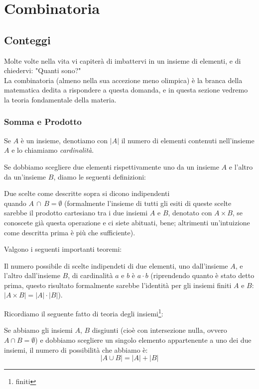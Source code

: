 \documentclass[11pt]{scrartcl}
\begin{document}
	\section{Combinatoria}
	
	\subsection{Conteggi}
	Molte volte nella vita vi capiterà di imbattervi in un insieme di elementi, e di chiedervi: "Quanti sono?"
	\\
	La combinatoria (almeno nella sua accezione meno olimpica) è la branca della matematica dedita a rispondere a questa domanda, e in questa sezione vedremo la teoria fondamentale della materia.
	
	\subsubsection{Somma e Prodotto}
	\begin{definition}
		Se $A$ è un insieme, denotiamo con $|A|$ il numero di elementi contenuti nell'insieme $A$ e lo chiamiamo \textit{cardinalità}.
	\end{definition}
	Se dobbiamo scegliere due elementi rispettivamente uno da un insieme $A$ e l'altro da un'insieme $B$, diamo le seguenti definizioni:
	\begin{definition}
		Due scelte come descritte sopra si dicono indipendenti \\ quando $A \, \cap \, B = \emptyset$ (formalmente l'insieme di tutti gli esiti di queste scelte sarebbe il prodotto cartesiano tra i due insiemi $A$ e $B$, denotato con $A \times B$, se conoscete già questa operazione e ci siete abituati, bene; altrimenti un'intuizione come descritta prima è più che sufficiente).
	\end{definition}
	Valgono i seguenti importanti teoremi:
	\begin{theorem}
		\label{C:prod}
		Il numero possibile di scelte indipendeti di due elementi, uno dall'insieme $A$, e l'altro dall'insieme $B$, di cardinalità $a$ e $b$ è $a \cdot b$ (riprendendo quanto è stato detto prima, questo risultato formalmente sarebbe l'identità per gli insiemi finiti $A$ e $B$: $|A\times B|=|A|\cdot|B|$).
	\end{theorem}
	Ricordiamo il seguente fatto di teoria degli insiemi\footnote{finiti}:
	\begin{theorem}
		Se abbiamo gli insiemi $A$, $B$ disgiunti (cioè con intersezione nulla, ovvero $A\cap B = \emptyset$) e dobbiamo scegliere un singolo elemento appartenente a uno dei due insiemi, il numero di possibilità che abbiamo è:
		$$|A\cup B|=|A|+|B|$$
	\end{theorem}
\end{document}
